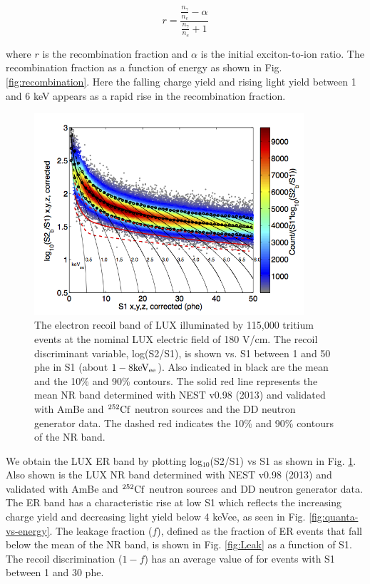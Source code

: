 \begin{displaymath}
r = \frac{\frac{n_{\gamma}}{n_e} - \alpha}{\frac{n_{\gamma}}{n_e} + 1}
\end{displaymath}

\noindent
where $r$ is the recombination fraction and $\alpha$ is the initial exciton-to-ion ratio. The recombination fraction as a function of energy as shown in Fig. \ref{fig:recombination}. Here the falling charge yield and rising light yield between 1 and 6 keV appears as a rapid rise in the recombination fraction. 

\begin{figure}[h!]\centering
\includegraphics[width=100mm]{fig/CH3T_fid_50_2_Dec_Tritium_Approval_Plots.png}
\caption{The electron recoil band of LUX illuminated by 115,000 tritium events at the nominal LUX electric field of 180 V/cm.  The recoil discriminant variable, log(S2/S1), is shown vs. S1 between 1 and 50 phe in S1 (about $\rm1-8 keV_{ee}$). Also indicated in black are the mean and the 10\% and 90\% contours. The solid red line represents the mean NR band determined with NEST v0.98 (2013) \cite{nest} and validated with AmBe and $\rm^{252}Cf$ neutron sources and the DD neutron generator data. The dashed red indicates the 10\% and 90\% contours of the NR band.}
\label{fig:ER_band}
\end{figure}

We obtain the LUX ER band by plotting log$_{10}$(S2/S1) vs S1 as shown in Fig. \ref{fig:ER_band}. Also shown is the LUX NR band determined with NEST v0.98 (2013) \cite{nest} and validated with AmBe and $\rm^{252}Cf$ neutron sources and DD neutron generator data. The ER band has a characteristic rise at low S1 which reflects the increasing charge yield and decreasing light yield below 4 keVee, as seen in Fig. \ref{fig:quanta-vs-energy}. The leakage fraction ($f$), defined as the fraction of ER events that fall below the mean of the NR band, is shown in Fig. \ref{fig:Leak} as a function of S1. The recoil discrimination ($1-f$) has an average value of  for events with S1 between 1 and 30 phe.


